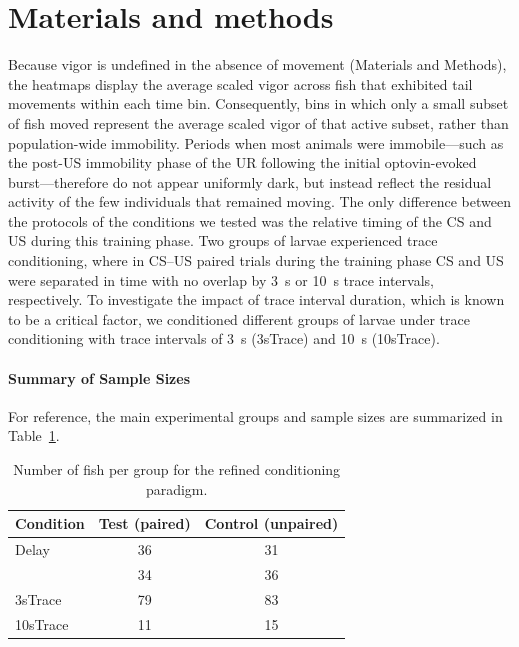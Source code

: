 
\section{Materials and methods}

Because vigor is undefined in the absence of movement (Materials and Methods), the heatmaps display the average scaled vigor across fish that exhibited tail movements within each time bin. Consequently, bins in which only a small subset of fish moved represent the average scaled vigor of that active subset, rather than population-wide immobility. Periods when most animals were immobile---such as the post-US immobility phase of the UR following the initial optovin-evoked burst---therefore do not appear uniformly dark, but instead reflect the residual activity of the few individuals that remained moving.
The only difference between the protocols of the conditions we tested was the relative timing of the CS and US during this training phase.
Two groups of larvae experienced trace conditioning, where in CS--US paired trials during the training phase CS and US were separated in time with no overlap by \SI{3}{\second} or \SI{10}{\second} trace intervals, respectively.
To investigate the impact of trace interval duration, which is known to be a critical factor, we conditioned different groups of larvae under trace conditioning with trace intervals of \SI{3}{\second} (3sTrace) and \SI{10}{\second} (10sTrace).





\paragraph{Summary of Sample Sizes}
For reference, the main experimental groups and sample sizes are summarized in Table~\ref{tab:groupsizes}.

\begin{table}[ht]
  \centering
  \caption{Number of fish per group for the refined conditioning paradigm.}
  \label{tab:groupsizes}
  \begin{tabular}{lcc}
    \toprule
    Condition & Test (paired) & Control (unpaired) \\
    \midrule
    Delay     & 36            & 31                 \\
     & 34            & 36                 \\
    3sTrace   & 79            & 83                 \\
    10sTrace  & 11            & 15                 \\
    \bottomrule
  \end{tabular}
\end{table}




